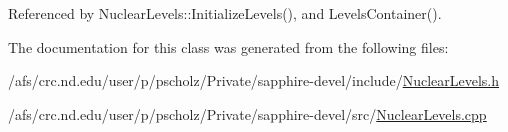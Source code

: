 Referenced by Nuclear\-Levels\-::\-Initialize\-Levels(), and Levels\-Container().



The documentation for this class was generated from the following files\-:\begin{DoxyCompactItemize}
\item 
/afs/crc.\-nd.\-edu/user/p/pscholz/\-Private/sapphire-\/devel/include/\hyperlink{NuclearLevels_8h}{Nuclear\-Levels.\-h}\item 
/afs/crc.\-nd.\-edu/user/p/pscholz/\-Private/sapphire-\/devel/src/\hyperlink{NuclearLevels_8cpp}{Nuclear\-Levels.\-cpp}\end{DoxyCompactItemize}
